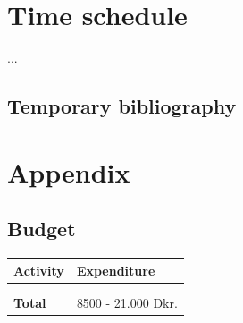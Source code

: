 \documentclass[a4paper]{article}
\begin{document}


\section{Time schedule} 
...

\subsection{Temporary bibliography}
 


\pagebreak
\section{Appendix}

\subsection{Budget}

\begin{center}
\begin{tabular}{  m{10cm} m{4cm} } 

	\hline
	\textbf{Activity}    & \textbf{Expenditure}\\
	\hline
	    &                               \\
 	    &                               \\
 	\hline
    \textbf{Total}       & 8500 - 21.000 Dkr.			    \\
    \hline

\end{tabular}
\end{center}
\end{document}
